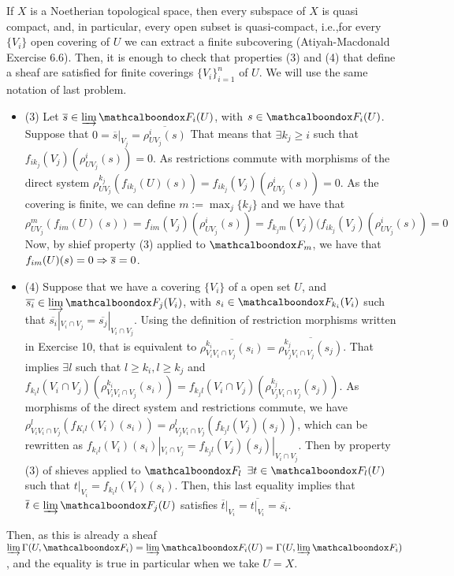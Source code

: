 \begin{sol}
	If $X$ is a Noetherian topological space, then every subspace of $X$ is quasi compact, and, in particular, every open subset is quasi-compact, i.e.,for every $\{V_i\}$ open covering of $U$ we can extract a finite subcovering (Atiyah-Macdonald Exercise 6.6). Then, it is enough to check that properties (3) and (4) that define a sheaf are satisfied for finite coverings $\{V_i\}_{i = 1}^n$ of $U$. We will use the same notation of last problem.
	\begin{itemize}
		\item (3) Let $\overline{s} \in \varinjlim \sF_i(U)$, with $s \in \sF_i(U)$. Suppose that $0 = \overline{s}|_{V_j} = \overline{\rho^i_{UV_j}(s)}$ That means that $\exists k_j \geq i$ such that $f_{i k_j}(V_j)(\rho^i_{UV_j}(s)) = 0$. As restrictions commute with morphisms of the direct system $\rho^{k_j}_{UV_j}(f_{ik_j}(U)(s)) = f_{i k_j}(V_j)(\rho^i_{UV_j}(s)) = 0$. As the covering is finite, we can define $m := \max_j\{k_j\}$ and we have that 
		\[
			\rho^m_{UV_j}(f_{im}(U)(s)) = f_{im}(V_j)(\rho^i_{UV_j}(s)) = f_{k_j m}(V_j)(f_{i k_j}(V_j)(\rho^i_{UV_j}(s)) = 0
		\]
		Now, by shief property (3) applied to $\sF_m$, we have that $f_{im}(U)(s) = 0 \Rightarrow \overline{s} = 0$.

		\item (4) Suppose that we have a covering $\{V_i\}$ of a open set $U$, and $\overline{s_i} \in \varinjlim \sF_j(V_i)$, with $s_i \in \sF_{k_i}(V_i)$ such that $\overline{s_i}|_{V_i \cap V_j} = \overline{s_j}|_{V_i \cap V_j}$. Using the definition of restriction morphisms written in Exercise 10, that is equivalent to $\overline{\rho^{k_i}_{V_i V_i \cap V_j}(s_i)} = \overline{\rho^{k_j}_{V_j V_i \cap V_j}(s_j)}$. That implies $\exists l$ such that $l \geq k_i, l \geq k_j$ and $f_{k_i l}(V_i \cap V_j)(\rho^{k_i}_{V_i V_i \cap V_j} (s_i)) =  f_{k_j l}(V_i \cap V_j)(\rho^{k_j}_{V_j V_i \cap V_j} (s_j))$. As morphisms of the direct system and restrictions commute, we have $\rho^l_{V_i V_i \cap V_j}(f_{K_i l}(V_i)(s_i)) = \rho^l_{V_j V_i \cap V_j}(f_{k_j l}(V_j)(s_j))$, which can be rewritten as $f_{k_i l}(V_i)(s_i)|_{V_i \cap V_j} = f_{k_j l}(V_j)(s_j)|_{V_i \cap V_j}$. Then by property (3) of shieves applied to $\sF_l$ $\exists t \in \sF_l(U)$ such that $t|_{V_i} = f_{k_i l}(V_i)(s_i)$. Then, this last equality implies that $\overline{t} \in \varinjlim \sF_j (U)$ satisfies $\overline{t}|_{V_i} = \overline{t|_{V_i}} = \overline{s_i}$.
	\end{itemize}
	Then, as this is already a sheaf $\varinjlim \Gamma(U, \sF_i) = \varinjlim \sF_i(U) = \Gamma(U, \varinjlim \sF_i)$, and the equality is true in particular when we take $U = X$.
\end{sol}

